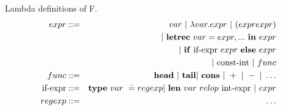 \documentclass{article}
\begin{document}
Lambda definitions of F.
\begin{eqnarray*}
    expr    &::=& var\ |\ \lambda var.expr\ |\ (expr expr)\\
               && |\ \textrm{\textbf{letrec}}\ var = expr, ...
                   \ \textrm{\textbf{in}}\ expr \\
               && |\ \textrm{\textbf{if}}\ \textrm{if-expr}\ expr
                   \ \textrm{\textbf{else}}\ expr \\
               && |\ \textrm{const-int}\ |\ func \\
    func    &::=& \textrm{\textbf{head}}\ |\ \textrm{\textbf{tail}} 
                  |\ \textrm{\textbf{cons}}\ |\ +\ |\ -\ |\ \ldots \\
    \textrm{if-expr} 
            &::=& \textrm{\textbf{type}}\ var\ \doteq regexp 
                  |\ \textrm{\textbf{len}}\ var\ relop\
                  \textrm{int-expr}\ |\ expr \\
    regexp  &::=& \ldots
\end{eqnarray*}


\end{document}
